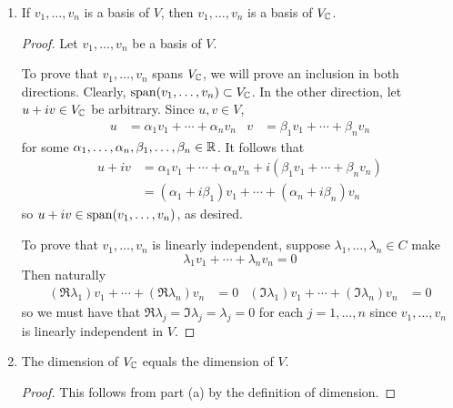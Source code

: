 \documentclass[../main.tex]{subfiles}
\begin{document}
\begin{itemize}
\begin{theorem}
\begin{enumerate}[label={\textup{(}\alph*\textup{)}}]
            \item If $v_1,\dots,v_n$ is a basis of $V$, then $v_1,\dots,v_n$ is a basis of $V_{\mathbb{C}}$.
            \begin{proof}
                Let $v_1,\dots,v_n$ be a basis of $V$.\par
                To prove that $v_1,\dots,v_n$ spans $V_{\mathbb{C}}$, we will prove an inclusion in both directions. Clearly, $\operatorname{span}(v_1,\dots,v_n)\subset V_{\mathbb{C}}$. In the other direction, let $u+iv\in V_{\mathbb{C}}$ be arbitrary. Since $u,v\in V$, 
                \begin{align*}
                    u &= \alpha_1v_1+\cdots+\alpha_nv_n&
                    v &= \beta_1v_1+\cdots+\beta_nv_n
                \end{align*}
                for some $\alpha_1,\dots,\alpha_n,\beta_1,\dots,\beta_n\in\mathbb{R}$. It follows that
                \begin{align*}
                    u+iv &= \alpha_1v_1+\cdots+\alpha_nv_n+i(\beta_1v_1+\cdots+\beta_nv_n)\\
                    &= (\alpha_1+i\beta_1)v_1+\cdots+(\alpha_n+i\beta_n)v_n
                \end{align*}
                so $u+iv\in\operatorname{span}(v_1,\dots,v_n)$, as desired.\par
                To prove that $v_1,\dots,v_n$ is linearly independent, suppose $\lambda_1,\dots,\lambda_n\in C$ make
                \begin{equation*}
                    \lambda_1v_1+\cdots+\lambda_nv_n = 0
                \end{equation*}
                Then naturally
                \begin{align*}
                    (\Re\lambda_1)v_1+\cdots+(\Re\lambda_n)v_n &= 0&
                    (\Im\lambda_1)v_1+\cdots+(\Im\lambda_n)v_n &= 0
                \end{align*}
                so we must have that $\Re\lambda_j=\Im\lambda_j=\lambda_j=0$ for each $j=1,\dots,n$ since $v_1,\dots,v_n$ is linearly independent in $V$.
            \end{proof}
            \item The dimension of $V_{\mathbb{C}}$ equals the dimension of $V$.
            \begin{proof}
                This follows from part (a) by the definition of dimension.
            \end{proof}
        \end{enumerate}
    \end{theorem}

\end{itemize}
\end{document}
